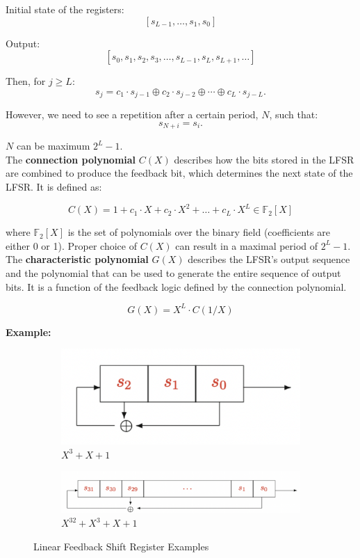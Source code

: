 Initial state of the registers:
\[
[s_{L-1}, \dots, s_1, s_0]
\]

Output:
\[
[s_0, s_1, s_2, s_3, \dots, s_{L-1}, s_L, s_{L+1}, \dots]
\]

Then, for \(j \geq L\):
\[
s_j = c_1 \cdot s_{j-1} \oplus c_2 \cdot s_{j-2} \oplus \cdots \oplus c_L \cdot s_{j-L}.
\]

However, we need to see a repetition after a certain period, \(N\), such that:
\[
s_{N+i} = s_i.
\]

\(N\) can be maximum \(2^L - 1\). \\

The \textbf{connection polynomial} $C(X)$ describes how the bits stored in the LFSR are combined to produce the feedback bit, which determines the next state of the LFSR. It is defined as:

\[ C(X) = 1 + c_1 \cdot X + c_2 \cdot X^2 + \dots + c_L \cdot X^L \in \mathbb{F}_2\left[X \right] \]

where $\mathbb{F}_2\left[X \right]$ is the set of polynomials over the binary field (coefficients are either 0 or 1). Proper choice of $C(X)$ can result in a maximal period of $2^L - 1$.\\

The \textbf{characteristic polynomial} $G(X)$ describes the LFSR's output sequence and the polynomial that can be used to generate the entire sequence of output bits. It is a function of the feedback logic defined by the connection polynomial.

\[ G(X) = X^L \cdot C(1/X) \]

\textbf{Example:}

\begin{figure}[h]
    \centering
    \begin{subfigure}{0.45\textwidth}
        \centering
        \includegraphics[width=\textwidth]{img/lfsr1.png}
        \caption{$X^3 + X + 1$}
    \end{subfigure}
    \hfill
    \begin{subfigure}{0.45\textwidth}
        \centering
        \includegraphics[width=\textwidth]{img/lfsr2.png}
        \caption{$X^{32} + X^3 + X + 1$}
    \end{subfigure}
    \caption{Linear Feedback Shift Register Examples}
    \label{fig:lfsr-examples}
\end{figure}

